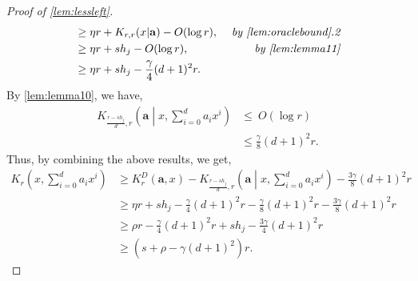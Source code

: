 \documentclass[a4paper,UKenglish,cleveref,autoref,thm-restate]{lipics-v2021}
\begin{document}
\begin{proof}[Proof of \cref{lem:lessleft}]
\begin{align*}
		&\geq\eta r+K_{r,r}(x|\mathbf{a})-O(\log r),&\textit{ by \cref{lem:oraclebound}.2}\\
		&\geq\eta r+sh_j-O(\log r),&\textit{ by \cref{lem:lemma11}}\\
		&\geq\eta r+sh_j-\frac{\gamma}{4}(d+1)^2r.
	\end{align*}
	By \cref{lem:lemma10}, we have,
	\begin{align*}
		K_{\frac{r-sh_j}{d},r}\left(\mathbf{a}\middle|x,\sum_{i=0}^{d}a_ix^i\right)&\leq\ O(\log r)\\
		&\leq\frac{\gamma}{8}(d+1)^2r.
	\end{align*}
	Thus, by combining the above results, we get,
	\begin{align*} 
		K_r\left(x,\sum_{i=0}^{d}a_ix^i\right)&\geq K_r^D(\mathbf{a},x)-K_{\frac{r-sh_j}{d},r}\left(\mathbf{a}\middle|x,\sum_{i=0}^{d}a_ix^i\right)-\frac{3\gamma}{8}(d+1)^2r\\
		&\geq\eta r+sh_j-\frac{\gamma}{4}(d+1)^2r-\frac{\gamma}{8}(d+1)^2r-\frac{3\gamma}{8}(d+1)^2r\\
		&\geq\rho r-\frac{\gamma}{4}(d+1)^2r+sh_j-\frac{3\gamma}{4}(d+1)^2r\\
		&\geq\left(s+\rho-\gamma(d+1)^2\right)r.
	\end{align*}
\end{proof}
\end{document}
